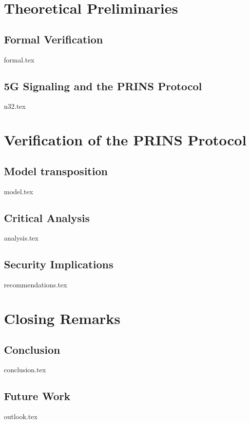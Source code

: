 \documentclass[a4paper,12pt,twoside]{report}
\begin{document}
\clearpage

\chapter{Theoretical Preliminaries}
\label{chap:theory}

\section{Formal Verification}
\label{sec:formal}
{formal.tex}

\section{5G Signaling and the PRINS Protocol}
\label{sec:n32}
{n32.tex}

\clearpage

\chapter{Verification of the PRINS Protocol}
\label{chap:formal}

\section{Model transposition}
\label{sec:model}
{model.tex}

\section{Critical Analysis}
\label{sec:analysis}
{analysis.tex}

\section{Security Implications}
\label{sec:implications}
{recommendations.tex}

\clearpage

\chapter{Closing Remarks}
\label{chap:intro}

\section{Conclusion}
\label{sec:conclusion}
{conclusion.tex}

\section{Future Work}
\label{sec:outlook}
{outlook.tex}

\clearpage

\printbibliography[title={Literature},heading=bibintoc,nottype=online]

\printbibliography[title={Online Sources},heading=bibintoc,type=online]

\clearpage

\appendices
\end{document}
